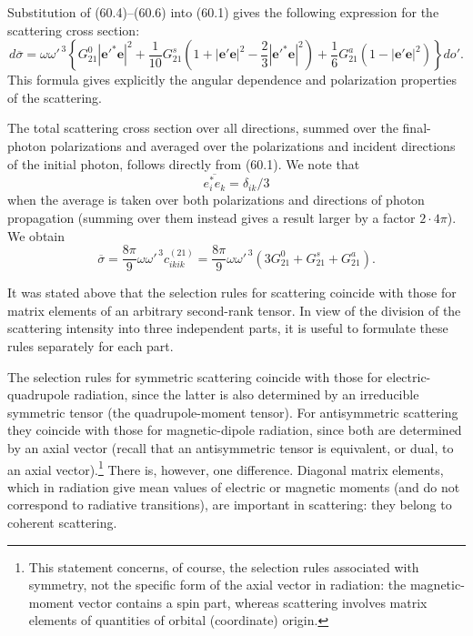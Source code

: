 Substitution of (60.4)--(60.6) into (60.1) gives the following expression for the scattering cross section:
\begin{equation}
d\overline\sigma=\omega\omega'^{\,3}\left\{G_{21}^0|\mathbf e'^*\mathbf e|^2
+\frac1{10}G_{21}^s\left(1+|\mathbf e'\mathbf e|^2-\frac23|\mathbf e'^*\mathbf e|^2\right)
+\frac16G_{21}^a\left(1-|\mathbf e'\mathbf e|^2\right)\right\}do'.
\tag{60.7}
\end{equation}
This formula gives explicitly the angular dependence and polarization properties of the scattering.

The total scattering cross section over all directions, summed over the final-photon polarizations and averaged over the polarizations and incident directions of the initial photon, follows directly from (60.1). We note that
\[
\overline{e_i^*e_k}=\delta_{ik}/3
\]
when the average is taken over both polarizations and directions of photon propagation (summing over them instead gives a result larger by a factor $2\cdot4\pi$). We obtain
\begin{equation}
\overline\sigma=\frac{8\pi}{9}\omega\omega'^{\,3}c_{ikik}^{(21)}
=\frac{8\pi}{9}\omega\omega'^{\,3}(3G_{21}^0+G_{21}^s+G_{21}^a).
\tag{60.8}
\end{equation}

It was stated above that the selection rules for scattering coincide with those for matrix elements of an arbitrary second-rank tensor. In view of the division of the scattering intensity into three independent parts, it is useful to formulate these rules separately for each part.

The selection rules for symmetric scattering coincide with those for electric-quadrupole radiation, since the latter is also determined by an irreducible symmetric tensor (the quadrupole-moment tensor). For antisymmetric scattering they coincide with those for magnetic-dipole radiation, since both are determined by an axial vector (recall that an antisymmetric tensor is equivalent, or dual, to an axial vector).\footnote{This statement concerns, of course, the selection rules associated with symmetry, not the specific form of the axial vector in radiation: the magnetic-moment vector contains a spin part, whereas scattering involves matrix elements of quantities of orbital (coordinate) origin.} There is, however, one difference. Diagonal matrix elements, which in radiation give mean values of electric or magnetic moments (and do not correspond to radiative transitions), are important in scattering: they belong to coherent scattering.


